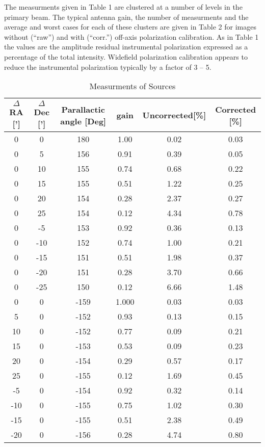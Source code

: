    The measurments given in Table 1 are clustered at a number of
levels in the primary beam.  The typical antenna gain, the number of
measurments and the average and worst cases for each of these clusters
are given in Table 2 for images without (``raw'') and with (``corr.'')
off-axis polarization calibration.  As in Table 1 the values are the
amplitude residual instrumental polarization expressed as a percentage
of the total intensity.
Widefield polarization calibration appears to reduce the instrumental
polarization typically by a factor of 3 -- 5.

\begin{table} [t]
\begin{center}
\caption{Measurments of Sources}
\medskip
\begin{tabular}{cccccc}
\hline \hline
$\Delta$ RA [']  & $\Delta$ Dec ['] & Parallactic angle
[Deg] & gain & Uncorrected[\%] & Corrected [\%]\\
\hline
0 & 0 & 180 & 1.00 & 0.02 & 0.03 \\
0 & 5 & 156 &  0.91 & 0.39 & 0.05 \\
0 & 10 & 155 & 0.74 & 0.68 & 0.22 \\
0 & 15 & 155 & 0.51 & 1.22 & 0.25 \\
0 & 20 & 154 & 0.28 & 2.37 & 0.27 \\
0 & 25 & 154 & 0.12 & 4.34 & 0.78 \\
0 & -5 & 153 & 0.92 & 0.36 & 0.13 \\
0 & -10 & 152 & 0.74 & 1.00 & 0.21 \\
0 & -15 & 151 & 0.51 & 1.98 & 0.37 \\
0 & -20 & 151 & 0.28 & 3.70 & 0.66 \\
0 & -25 & 150 & 0.12 & 6.66 & 1.48 \\
 0 & 0   & -159 & 1.000 & 0.03 & 0.03 \\
 5  & 0  & -152 & 0.93 & 0.13 & 0.15 \\
 10 & 0  & -152 & 0.77 & 0.09 & 0.21 \\
 15 & 0  & -153 & 0.53 & 0.09 & 0.23 \\
 20 & 0  & -154 & 0.29 & 0.57 & 0.17 \\
 25 & 0  & -155 & 0.12 & 1.69 & 0.45 \\
 -5 & 0  & -154 & 0.92 & 0.32 & 0.14 \\
 -10 & 0 & -155 & 0.75 & 1.02 & 0.30 \\
 -15 & 0 & -155 & 0.51 & 2.38 & 0.49 \\
 -20 & 0 & -156 & 0.28 & 4.74 & 0.80 \\

\end{tabular}
\end{center}
\end{table}
